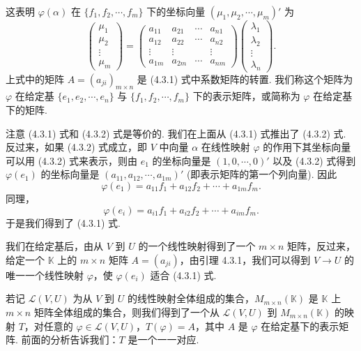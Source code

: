\documentclass[UTF8,12pt,a4paper,fontset=fandol]{ctexart}
\begin{document}
这表明 $\varphi(\alpha)$ 在 $\{f_1,f_2,\cdots,f_m\}$ 下的坐标向量 $(\mu_1,\mu_2,\cdots,\mu_m)'$ 为
\begin{equation}
\left(\begin{array}{c}
\mu_1\\
\mu_2\\
\vdots\\
\mu_m
\end{array}\right)
=
\left(\begin{array}{cccc}
a_{11} & a_{21} & \cdots & a_{n1}\\
a_{12} & a_{22} & \cdots & a_{n2}\\
\vdots & \vdots & & \vdots\\
a_{1m} & a_{2m} & \cdots & a_{nm}
\end{array}\right)
\left(\begin{array}{c}
\lambda_1\\
\lambda_2\\
\vdots\\
\lambda_n
\end{array}\right).
\tag{4.3.2}
\end{equation}
上式中的矩阵 $A=(a_{ji})_{m\times n}$ 是 (4.3.1) 式中系数矩阵的转置. 我们称这个矩阵为 $\varphi$ 在给定基 $\{e_1,e_2,\cdots,e_n\}$ 与 $\{f_1,f_2,\cdots,f_m\}$ 下的表示矩阵，或简称为 $\varphi$ 在给定基下的矩阵.

注意 (4.3.1) 式和 (4.3.2) 式是等价的. 我们在上面从 (4.3.1) 式推出了 (4.3.2) 式. 反过来，如果 (4.3.2) 式成立，即 $V$ 中向量 $\alpha$ 在线性映射 $\varphi$ 的作用下其坐标向量可以用 (4.3.2) 式来表示，则由 $e_1$ 的坐标向量是 $(1,0,\cdots,0)'$ 以及 (4.3.2) 式得到 $\varphi(e_1)$ 的坐标向量是 $(a_{11},a_{12},\cdots,a_{1m})'$ (即表示矩阵的第一个列向量). 因此
\[
\varphi(e_1)=a_{11}f_1+a_{12}f_2+\cdots+a_{1m}f_m.
\]
同理，
\[
\varphi(e_i)=a_{i1}f_1+a_{i2}f_2+\cdots+a_{im}f_m.
\]
于是我们得到了 (4.3.1) 式.

我们在给定基后，由从 $V$ 到 $U$ 的一个线性映射得到了一个 $m\times n$ 矩阵，反过来，给定一个 $\mathbb{K}$ 上的 $m\times n$ 矩阵 $A=(a_{ji})$，由引理 4.3.1，我们可以得到 $V\to U$ 的唯一一个线性映射 $\varphi$，使 $\varphi(e_i)$ 适合 (4.3.1) 式.

若记 $\mathcal{L}(V,U)$ 为从 $V$ 到 $U$ 的线性映射全体组成的集合，$M_{m\times n}(\mathbb{K})$ 是 $\mathbb{K}$ 上 $m\times n$ 矩阵全体组成的集合，则我们得到了一个从 $\mathcal{L}(V,U)$ 到 $M_{m\times n}(\mathbb{K})$ 的映射 $T$，对任意的 $\varphi\in\mathcal{L}(V,U)$，$T(\varphi)=A$，其中 $A$ 是 $\varphi$ 在给定基下的表示矩阵. 前面的分析告诉我们：$T$ 是一个一一对应.
\end{document}
